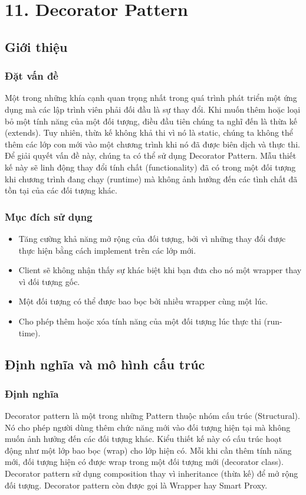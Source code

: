 \chapter{11. Decorator Pattern}
\section{Giới thiệu}
\subsection{Đặt vấn đề}
Một trong những khía cạnh quan trọng nhất trong quá trình phát triển một ứng dụng mà các lập trình viên phải đối đầu là sự thay đổi. Khi muốn thêm hoặc loại bỏ một tính năng của một đối tượng, điều đầu tiên chúng ta nghĩ đến là thừa kế (extends). Tuy nhiên, thừa kế không khả thi vì nó là static, chúng ta không thể thêm các lớp con mới vào một chương trình khi nó đã được biên dịch và thực thi.\\
Để giải quyết vấn đề này, chúng ta có thể sử dụng Decorator Pattern. Mẫu thiết kế này sẽ linh động thay đổi tính chất (functionality) đã có trong một đối tượng khi chương trình đang chạy (runtime) mà không ảnh hưởng đến các tình chất đã tồn tại của các đối tượng khác.
\subsection{Mục đích sử dụng}
\begin{itemize}
    \item Tăng cường khả năng mở rộng của đối tượng, bởi vì những thay đổi được thực hiện bằng cách implement trên các lớp mới.
    \item Client sẽ không nhận thấy sự khác biệt khi bạn đưa cho nó một wrapper thay vì đối tượng gốc.
    \item Một đối tượng có thể được bao bọc bởi nhiều wrapper cùng một lúc.
    \item Cho phép thêm hoặc xóa tính năng của một đối tượng lúc thực thi (run-time).
\end{itemize}

\section{Định nghĩa và mô hình cấu trúc}
\subsection{Định nghĩa}
Decorator pattern là một trong những Pattern thuộc nhóm cấu  trúc (Structural). Nó cho phép người dùng thêm chức năng mới vào đối tượng hiện tại mà không muốn ảnh hưởng đến các đối tượng khác. Kiểu thiết kế này có cấu trúc hoạt động như một lớp bao bọc (wrap) cho lớp hiện có. Mỗi khi cần thêm tính năng mới, đối tượng hiện có được wrap trong một đối tượng mới (decorator class).\\
Decorator pattern sử dụng composition thay vì inheritance (thừa kế) để mở rộng đối tượng. Decorator pattern còn được gọi là Wrapper hay Smart Proxy.
